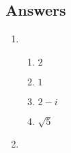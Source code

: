 \newpage
\subsection{Answers}

\begin{enumerate}
\item \begin{enumerate}
\item $2$
\item $1$
\item $2 - i$
\item $\sqrt{5}$
\end{enumerate}
\item 
\end{enumerate}